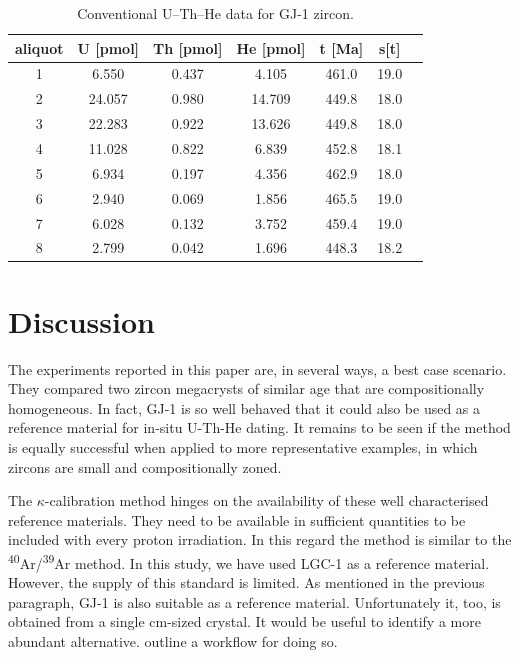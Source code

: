 \documentclass{article}
\begin{document}
\label{tab:results2}

 
\begin{table}[!ht]
  \caption{Conventional U--Th--He data for GJ-1 zircon.}
  \begin{tabular}{ccccccc}
    aliquot & U [pmol] & Th [pmol] & He [pmol] & t [Ma] & s[t] \\ \hline
    1 & 6.550 & 0.437 & 4.105 & 461.0 & 19.0 \\
    2 & 24.057 & 0.980 & 14.709 & 449.8 & 18.0 \\
    3 & 22.283 & 0.922 & 13.626 & 449.8 & 18.0 \\
    4 & 11.028 & 0.822 & 6.839& 452.8 & 18.1 \\
    5 & 6.934 & 0.197 & 4.356 & 462.9 & 18.0 \\
    6 & 2.940 & 0.069 & 1.856 & 465.5 & 19.0 \\
    7 & 6.028 & 0.132 & 3.752 & 459.4 & 19.0 \\
    8 & 2.799 & 0.042 & 1.696 & 448.3 & 18.2
  \end{tabular}
  \label{tab:conventional}
\end{table}

\section{Discussion}
\label{sec:discussion}

The experiments reported in this paper are, in several ways, a best
case scenario.  They compared two zircon megacrysts of similar age
that are compositionally homogeneous. In fact, GJ-1 is so well behaved
that it could also be used as a reference material for in-situ U-Th-He
dating. It remains to be seen if the method is equally successful when
applied to more representative examples, in which zircons are small
and compositionally zoned.\medskip

The $\kappa$-calibration method hinges on the availability of these
well characterised reference materials. They need to be available in
sufficient quantities to be included with every proton irradiation.
In this regard the method is similar to the
\textsuperscript{40}Ar/\textsuperscript{39}Ar method. In this study,
we have used LGC-1 as a reference material. However, the supply of
this standard is limited. As mentioned in the previous paragraph, GJ-1
is also suitable as a reference material. Unfortunately it, too, is
obtained from a single cm-sized crystal. It would be useful to
identify a more abundant alternative. \citet{tian2017} outline a
workflow for doing so.\medskip
\end{document}
